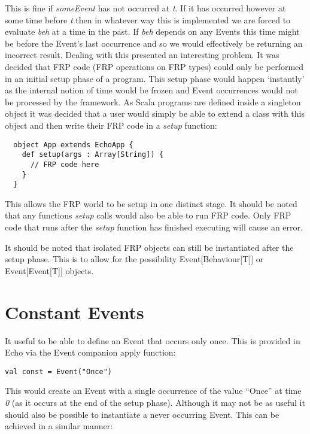       This is fine if \emph{someEvent} has not occurred at \emph{t}. If it has occurred however at some time
      before \emph{t} then in whatever way this is implemented we are forced to evaluate \emph{beh}
      at a time in the past. If \emph{beh} depends on any Events this time might be before the Event's
      last occurrence and so we would effectively be returning an incorrect result. Dealing with this
      presented an interesting problem. It was decided that FRP
      code (FRP operations on FRP types) could only be performed in an initial setup phase of a program.
      This setup phase would happen `instantly' as the internal notion of time would be frozen and Event
      occurrences would not be processed by the framework. As Scala programs are defined inside a singleton
      object it was decided that a user would simply be able to extend a class with this object and then
      write their FRP code in a \emph{setup} function:

  \begin{verbatim}
  object App extends EchoApp {
    def setup(args : Array[String]) {
      // FRP code here
    }
  }
  \end{verbatim}
  
    This allows the FRP world to be setup in one distinct stage. It should be noted that
    any functions \emph{setup} calls would also be able to run FRP code. Only FRP code that runs
    after the \emph{setup} function has finished executing will cause an error.
    
    It should be noted that isolated FRP objects can still be instantiated after the setup phase. This is
    to allow for the possibility Event[Behaviour[T]] or Event[Event[T]] objects.
  
  \section{Constant Events}
    It useful to be able to define an Event that occurs only once. This is provided in Echo
    via the Event companion apply function:

\begin{verbatim}
val const = Event("Once")
\end{verbatim}    

    This would create an Event with a single occurrence of the value ``Once'' at time \emph{0} (as
    it occurs at the end of the setup phase).
    Although it may not be as useful it should also be possible to instantiate a never occurring
    Event. This can be achieved in a similar manner:

